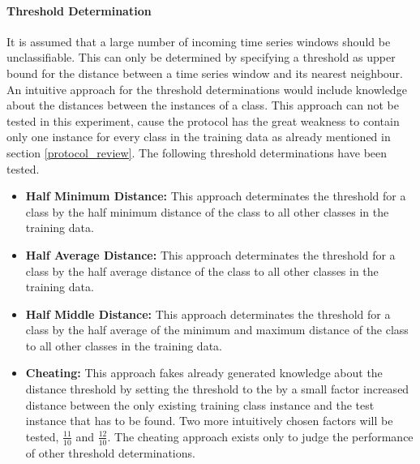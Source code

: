 \paragraph{Threshold Determination} \label{threshold_determination}
It is assumed that a large number of incoming time series windows should be unclassifiable. This can only be determined
by specifying a threshold as upper bound for the distance between a time series window and its nearest neighbour. An
intuitive approach for the threshold determinations would include knowledge about the distances between the instances of
a class. This approach can not be tested in this experiment, cause the protocol has the great weakness to contain only
one instance for every class in the training data as already mentioned in section \ref{protocol_review}. The following
threshold determinations have been tested.

\begin{itemize}
    \item \textbf{Half Minimum Distance:} This approach determinates the threshold for a class by the half minimum
    distance of the class to all other classes in the training data.
    \item \textbf{Half Average Distance:} This approach determinates the threshold for a class by the half average
    distance of the class to all other classes in the training data.
    \item \textbf{Half Middle Distance:} This approach determinates the threshold for a class by the half average of the
    minimum and maximum distance of the class to all other classes in the training data.
    \item \textbf{Cheating:} This approach fakes already generated knowledge about the distance threshold by setting the
    threshold to the by a small factor increased distance between the only existing training class instance and the test
    instance that has to be found. Two more intuitively chosen factors will be tested, $\frac{11}{10}$ and
    $\frac{12}{10}$. The cheating approach exists only to judge the performance of other threshold determinations.
\end{itemize}
